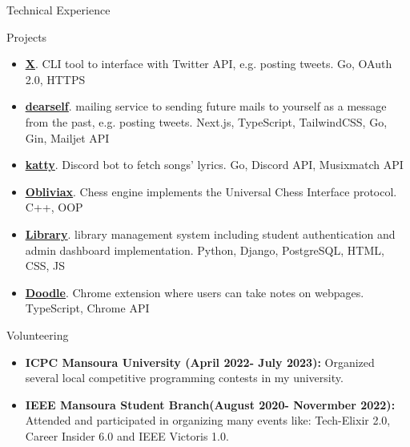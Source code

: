 \documentclass[]{cv}
\begin{document}
	\begin{cvsection}{Technical Experience}
	\vspace{3mm}

		\begin{cvsubsection}{Projects}{}{}
			\begin{itemize}
				\item \textbf{{\color{blue}\underline{\href{https://github.com/devhindo/x}{X}}}}. CLI tool to interface with Twitter API, e.g. posting tweets.  Go, OAuth 2.0, HTTPS
				
				\item \textbf{{\color{blue}\underline{\href{https://github.com/devhindo/dearself}{dearself}}}}. mailing service to sending future mails to yourself as a message from the past, e.g. posting tweets.  Next.js, TypeScript, TailwindCSS, Go, Gin, Mailjet API

				\item \textbf{{\color{blue}\underline{\href{https://github.com/devhindo/katty}{katty}}}}. Discord bot to fetch songs' lyrics.  Go, Discord API, Musixmatch API				
				
				\item \textbf{{\color{blue}\underline{\href{https://github.com/devhindo/obliviax}{Obliviax}}}}. Chess engine implements the Universal Chess Interface protocol.  C++, OOP
				
				
				
				\item \textbf{{\color{blue}\underline{\href{https://github.com/lilhind/iti23/tree/main/library}{Library}}}}. library management system including student authentication and admin dashboard implementation.  Python, Django, PostgreSQL, HTML, CSS, JS

				\item \textbf{{\color{blue}\underline{\href{https://github.com/devhindo/doodle}{Doodle}}}}. Chrome extension where users can take notes on webpages. TypeScript, Chrome API				
				

			\end{itemize}
		\end{cvsubsection}
	\end{cvsection}
	
	\begin{cvsection}{Volunteering}
				\vspace{3mm}

		\begin{cvsubsection}{}{}{}	
			\begin{itemize}
				\item \textbf{ICPC Mansoura University (April 2022- July 2023):} Organized several local competitive programming contests in my university.
				\item \textbf{IEEE Mansoura Student Branch(August 2020- Novermber 2022):} Attended and participated in organizing many events like: Tech-Elixir 2.0, Career Insider 6.0 and 
IEEE Victoris 1.0. 
			\end{itemize}
		\end{cvsubsection}
	\end{cvsection}
\end{document}

